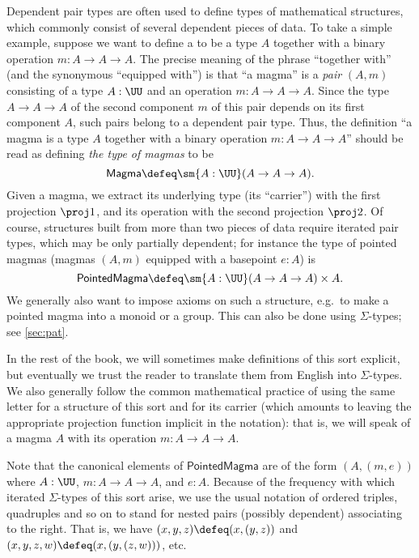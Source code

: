 Dependent pair types are often used to define types of mathematical structures, which commonly consist of several dependent pieces of data.
To take a simple example, suppose we want to define a  to be a type $A$ together with a binary operation $m:A\to A\to A$.
The precise meaning of the phrase ``together with'' (and the synonymous ``equipped with'') is that ``a magma'' is a \emph{pair} $(A,m)$ consisting of a type $A:\UU$ and an operation $m:A\to A\to A$.
Since the type $A\to A\to A$ of the second component $m$ of this pair depends on its first component $A$, such pairs belong to a dependent pair type.
Thus, the definition ``a magma is a type $A$ together with a binary operation $m:A\to A\to A$'' should be read as defining \emph{the type of magmas} to be
\[ \mathsf{Magma} \defeq \sm{A:\UU} (A\to A\to A). \]
Given a magma, we extract its underlying type (its ``carrier'') with the first projection $\proj1$, and its operation with the second projection $\proj2$.
Of course, structures built from more than two pieces of data require iterated pair types, which may be only partially dependent; for instance the type of pointed magmas (magmas $(A,m)$ equipped with a basepoint $e:A$) is
\[ \mathsf{PointedMagma} \defeq \sm{A:\UU} (A\to A\to A) \times A. \]
We generally also want to impose axioms on such a structure, e.g.\ to make a pointed magma into a monoid or a group.
This can also be done using $\Sigma$-types; see \cref{sec:pat}.

In the rest of the book, we will sometimes make definitions of this sort explicit, but eventually we trust the reader to translate them from English into $\Sigma$-types.
We also generally follow the common mathematical practice of using the same letter for a structure of this sort and for its carrier (which amounts to leaving the appropriate projection function implicit in the notation): that is, we will speak of a magma $A$ with its operation $m:A\to A\to A$.

Note that the canonical elements of $\mathsf{PointedMagma}$ are of the form $(A,(m,e))$ where $A:\UU$, $m:A\to A\to A$, and $e:A$.
Because of the frequency with which iterated $\Sigma$-types of this sort arise, we use the usual notation of ordered triples, quadruples and so on to stand for nested pairs (possibly dependent) associating to the right.
That is, we have $(x,y,z) \defeq (x,(y,z))$ and $(x,y,z,w)\defeq (x,(y,(z,w)))$, etc.

%

